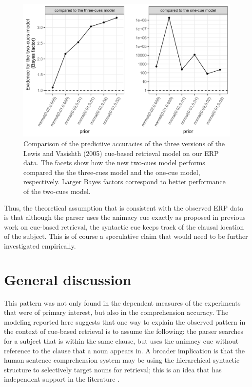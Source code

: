 \documentclass[a4paper, man, floatsintext]{apa7}
\begin{document}
{\begin{figure}
    \centering
    \caption{Comparison of the predictive accuracies of the three versions of the Lewis and Vasishth (2005) cue-based retrieval model on our ERP data. The facets show how the new two-cues model performs compared the the three-cues model and the one-cue model, respectively. Larger Bayes factors correspond to better performance of the two-cues model.}
    \label{fig:BF_compmods}
    \includegraphics[width=\linewidth]{images/BF_plot_compmodels.png}
\end{figure}

Thus, the theoretical assumption that is consistent with the observed ERP data is that although the parser uses the animacy cue exactly as proposed in previous work on cue-based retrieval, the syntactic cue keeps track of the clausal location of the subject. This is of course a speculative claim that would need to be further investigated empirically. 

}%

\section{General discussion}

\label{only_this_design} This pattern was not only found in the dependent measures of the experiments that were of primary interest, but also in the comprehension accuracy. 
The modeling reported here suggests that one way to explain the observed pattern in the context of cue-based retrieval is to assume the following: the parser searches for a subject that is within the same clause, but uses the animacy cue without reference to the clause that a noun appears in. A broader implication is that the human sentence comprehension system may be using the hierarchical syntactic structure to selectively target nouns for retrieval; this is an idea that has independent support in the literature \citep[e.g.,][]{Sturt2003,dillon2013,yadav2021individual}.
\end{document}
